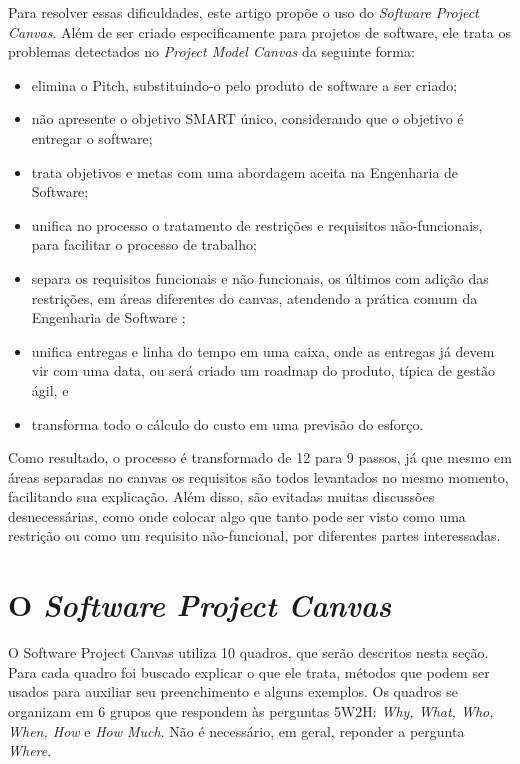 \documentclass[a4]{report}
\begin{document}
Para resolver essas dificuldades, este artigo propõe o uso do \textit{Software Project Canvas}. Além de ser criado especificamente para projetos de software, ele trata os problemas detectados no \textit{Project Model Canvas} da seguinte forma:
\begin{itemize}
    \item elimina o Pitch, substituindo-o pelo produto de software a ser criado;
    \item não apresente o objetivo SMART único, considerando que o objetivo é entregar o software;
    \item trata objetivos e metas com uma abordagem aceita na Engenharia de Software\citep{ruble_practical_1997};
    \item unifica no processo o tratamento de restrições e requisitos não-funcionais, para facilitar o processo de trabalho;
    \item separa os requisitos funcionais e não funcionais, os últimos com adição das restrições, em áreas diferentes do canvas, atendendo a prática comum da Engenharia de Software \citep{pressman:2019};
    \item unifica entregas e linha do tempo em uma caixa, onde as entregas já devem vir com uma data, ou será criado um roadmap do produto, típica de gestão ágil, e
    \item transforma todo o cálculo do custo em uma previsão do esforço\citep{mike:agile:estimating}.
\end{itemize}

Como resultado, o processo é transformado de 12 para 9 passos, já que mesmo em áreas separadas no canvas os requisitos são todos levantados no mesmo momento, facilitando sua explicação. Além disso, são evitadas muitas discussões desnecessárias, como onde colocar algo que tanto pode ser visto como uma restrição ou como um requisito não-funcional, por diferentes partes interessadas.

\section{O \textit{Software Project Canvas}}

O Software Project Canvas utiliza 10 quadros, que serão descritos nesta seção. Para cada quadro foi buscado explicar o que ele trata, métodos que podem ser usados para auxiliar seu preenchimento e alguns exemplos. Os quadros se organizam em 6 grupos que respondem às perguntas 5W2H\citep{nakagawa:2012:5w2h}: \textit{Why, What, Who, When, How} e \textit{How Much}. Não é necessário, em geral, reponder a pergunta \textit{Where}.
\end{document}
